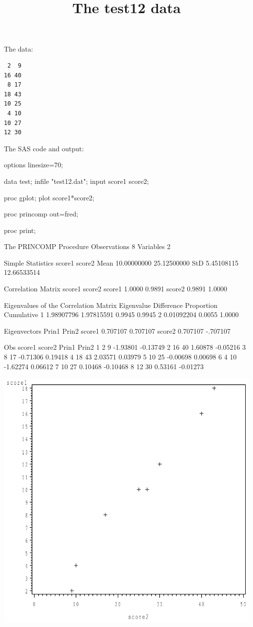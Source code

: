\documentclass{article}
\title{The test12 data}
\begin{document}
\maketitle
The data:
\begin{verbatim}
 2  9
16 40
 8 17
18 43
10 25
 4 10
10 27
12 30

\end{verbatim}
The SAS code and output:
\begin{Winput}

options linesize=70;

data test;
    infile "test12.dat";
    input score1 score2;

proc gplot;
    plot score1*score2;
    
proc princomp out=fred;

proc print;
\end{Winput}
\begin{Woutput}
The PRINCOMP Procedure
Observations           8
Variables              2

           Simple Statistics
                score1            score2
Mean       10.00000000       25.12500000
StD         5.45108115       12.66533514

      Correlation Matrix
            score1      score2
score1      1.0000      0.9891
score2      0.9891      1.0000

            Eigenvalues of the Correlation Matrix
        Eigenvalue    Difference    Proportion    Cumulative
   1    1.98907796    1.97815591        0.9945        0.9945
   2    0.01092204                      0.0055        1.0000

           Eigenvectors
               Prin1         Prin2
score1      0.707107      0.707107
score2      0.707107      -.707107

Obs    score1    score2      Prin1       Prin2
 1        2         9      -1.93801    -0.13749
 2       16        40       1.60878    -0.05216
 3        8        17      -0.71306     0.19418
 4       18        43       2.03571     0.03979
 5       10        25      -0.00698     0.00698
 6        4        10      -1.62274     0.06612
 7       10        27       0.10468    -0.10468
 8       12        30       0.53161    -0.01273
\end{Woutput}
\includegraphics[]{test12-1-SAS-fig.pdf}
\end{document}

